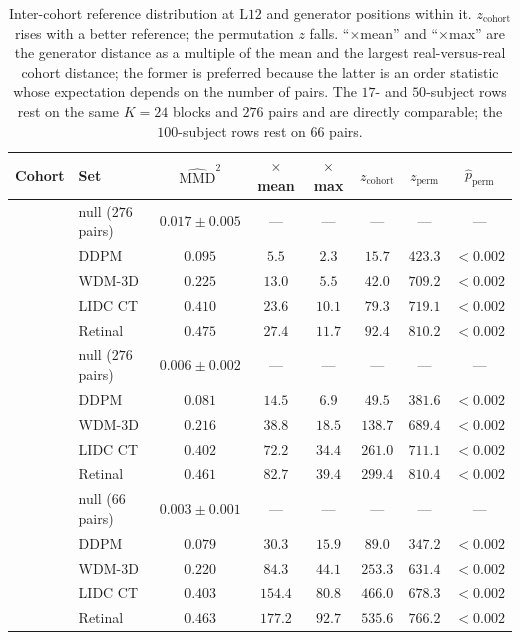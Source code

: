 \documentclass[preprint,12pt,authoryear]{elsarticle}
\newcommand{\mmd}{\mathrm{MMD}}
\newcommand{\Lb}[1]{\ensuremath{\mathrm{L}#1}}
\begin{document}
\begin{table}[t]
\centering
\caption{Inter-cohort reference distribution at \Lb{12} and generator positions
within it. $z_{\mathrm{cohort}}$ rises with a better reference; the permutation
$z$ falls. ``$\times$mean'' and ``$\times$max'' are the generator distance as a
multiple of the mean and the largest real-versus-real cohort distance; the
former is preferred because the latter is an order statistic whose expectation
depends on the number of pairs. The $17$- and $50$-subject rows rest on the
same $K = 24$ blocks and $276$ pairs and are directly comparable; the
$100$-subject rows rest on $66$ pairs.}
\label{tab:cohortnull}
\small
\begin{tabular}{llcccccc}
\toprule
Cohort & Set & $\widehat{\mmd}^2$ & $\times$mean & $\times$max
 & $z_{\mathrm{cohort}}$ & $z_{\mathrm{perm}}$ & $\hat{p}_{\mathrm{perm}}$ \\
\midrule
{}
 & null ($276$ pairs) & $0.017 \pm 0.005$ & --- & --- & --- & --- & --- \\
 & DDPM      & $0.095$ & $5.5$  & $2.3$  & $15.7$ & $423.3$ & $<0.002$ \\
 & WDM-3D    & $0.225$ & $13.0$ & $5.5$  & $42.0$ & $709.2$ & $<0.002$ \\
 & LIDC CT   & $0.410$ & $23.6$ & $10.1$ & $79.3$ & $719.1$ & $<0.002$ \\
 & Retinal   & $0.475$ & $27.4$ & $11.7$ & $92.4$ & $810.2$ & $<0.002$ \\
\midrule
{}
 & null ($276$ pairs) & $0.006 \pm 0.002$ & --- & --- & --- & --- & --- \\
 & DDPM      & $0.081$ & $14.5$ & $6.9$  & $49.5$  & $381.6$ & $<0.002$ \\
 & WDM-3D    & $0.216$ & $38.8$ & $18.5$ & $138.7$ & $689.4$ & $<0.002$ \\
 & LIDC CT   & $0.402$ & $72.2$ & $34.4$ & $261.0$ & $711.1$ & $<0.002$ \\
 & Retinal   & $0.461$ & $82.7$ & $39.4$ & $299.4$ & $810.4$ & $<0.002$ \\
\midrule
{}
 & null ($66$ pairs) & $0.003 \pm 0.001$ & --- & --- & --- & --- & --- \\
 & DDPM      & $0.079$ & $30.3$  & $15.9$ & $89.0$  & $347.2$ & $<0.002$ \\
 & WDM-3D    & $0.220$ & $84.3$  & $44.1$ & $253.3$ & $631.4$ & $<0.002$ \\
 & LIDC CT   & $0.403$ & $154.4$ & $80.8$ & $466.0$ & $678.3$ & $<0.002$ \\
 & Retinal   & $0.463$ & $177.2$ & $92.7$ & $535.6$ & $766.2$ & $<0.002$ \\
\bottomrule
\end{tabular}
\end{table}
\end{document}
